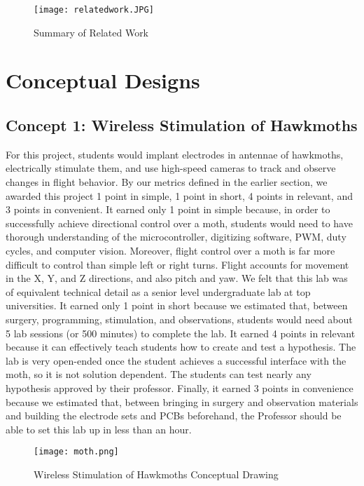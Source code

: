 \documentclass{article}
\begin{document}
\begin{figure}[ht!]
\centering
\texttt{[image: relatedwork.JPG]}
\caption{Summary of Related Work}
\label{fig:relatedwork}
\end{figure}

\section{Conceptual Designs}

\subsection{Concept 1: Wireless Stimulation of Hawkmoths}
 For this project, students would implant electrodes in antennae of hawkmoths, electrically stimulate them, and use high-speed cameras to track and observe changes in flight behavior. By our metrics defined in the earlier section, we awarded this project 1 point in simple, 1 point in short, 4 points in relevant, and 3 points in convenient. It earned only 1 point in simple because, in order to successfully achieve directional control over a moth, students would need to have thorough understanding of the microcontroller, digitizing software, PWM, duty cycles, and computer vision. Moreover, flight control over a moth is far more difficult to control than simple left or right turns. Flight accounts for movement in the X, Y, and Z directions, and also pitch and yaw. We felt that this lab was of equivalent technical detail as a senior level undergraduate lab at top universities. It earned only 1 point in short because we estimated that, between surgery, programming, stimulation, and observations, students would need about 5 lab sessions (or 500 minutes) to complete the lab. It earned 4 points in relevant because it can effectively teach students how to create and test a hypothesis. The lab is very open-ended once the student achieves a successful interface with the moth, so it is not solution dependent. The students can test nearly any hypothesis approved by their professor. Finally, it earned 3 points in convenience because we estimated that, between bringing in surgery and observation materials and building the electrode sets and PCBs beforehand, the Professor should be able to set this lab up in less than an hour.

\begin{figure}[ht!]
\centering
\texttt{[image: moth.png]}
\caption{Wireless Stimulation of Hawkmoths Conceptual Drawing}
\label{fig:concept1}
\end{figure}
\end{document}
